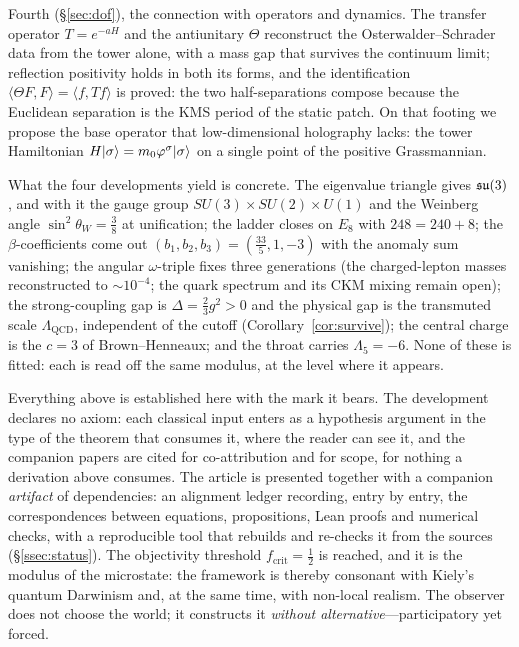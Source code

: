 Fourth (\S\ref{sec:dof}), the connection with operators and dynamics. The transfer operator
$T=e^{-aH}$ and the antiunitary $\Theta$ reconstruct the Osterwalder--Schrader data from the
tower alone, with a mass gap that survives the continuum limit; reflection positivity holds in
both its forms, and the identification $\langle\Theta F,F\rangle=\langle f,Tf\rangle$ is
proved: the two half-separations compose because the Euclidean separation is the KMS period of
the static patch. On that footing we propose the base operator that low-dimensional holography
lacks: the tower Hamiltonian $H\lvert\sigma\rangle=m_0\varphi^{\sigma}\lvert\sigma\rangle$ on
a single point of the positive Grassmannian.

What the four developments yield is concrete. The eigenvalue triangle gives $\mathfrak{su}(3)$, and with
it the gauge group $SU(3)\times SU(2)\times U(1)$ and the Weinberg angle
$\sin^2\theta_W=\tfrac38$ at unification; the ladder closes on $E_8$ with $248=240+8$; the
$\beta$-coefficients come out $(b_1,b_2,b_3)=(\tfrac{33}5,1,-3)$ with the anomaly sum
vanishing; the angular $\omega$-triple fixes three generations (the charged-lepton masses
reconstructed to $\sim10^{-4}$; the quark spectrum and its CKM mixing remain open); the
strong-coupling gap is $\Delta=\tfrac23g^{2}>0$ and the physical gap is the transmuted scale
$\Lambda_{\mathrm{QCD}}$, independent of the cutoff (Corollary~\ref{cor:survive}); the central charge is the
$c=3$ of Brown--Henneaux; and the throat carries $\Lambda_5=-6$. None of these is fitted: each
is read off the same modulus, at the level where it appears.

Everything above is established here with the mark it bears. The development declares no axiom:
each classical input enters as a hypothesis argument in the type of the theorem that consumes
it, where the reader can see it, and the companion papers are cited for co-attribution and for
scope, for nothing a derivation above consumes. The article is presented together with a
companion \emph{artifact} of dependencies: an alignment ledger recording, entry by entry, the
correspondences between equations, propositions, Lean proofs and numerical checks, with a
reproducible tool that rebuilds and re-checks it from the sources (\S\ref{ssec:status}). The
objectivity threshold $f_{\mathrm{crit}}=\tfrac12$ is reached, and it is the modulus of the
microstate: the framework is thereby consonant with Kiely's quantum Darwinism and, at the same
time, with non-local realism. The observer does not choose the world; it constructs it
\emph{without alternative}---participatory yet forced.

